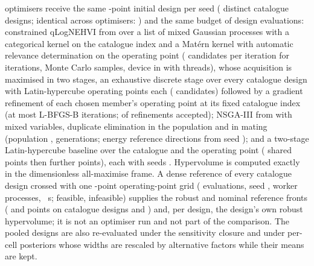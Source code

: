 \MdbStrategyCount{} optimisers receive the same \MdbInitialDesign-point initial design
per seed (\MdbInitialDesign{} distinct catalogue designs; identical across optimisers:
\MdbSharedInitialIdentical) and the same budget of \MdbEvaluationsPerRun{} design
evaluations: constrained qLogNEHVI from \MdbBoLibrary{} \MdbBotorchVersion{} over a
list of mixed Gaussian processes with a categorical kernel on the catalogue index and
a Mat\'ern kernel with automatic relevance determination on the operating point
(\MdbBoBatch{} candidates per iteration for \MdbBoIterations{} iterations,
\MdbBoMcSamples{} Monte Carlo samples, device \texttt{\MdbBoDevice} in
\texttt{\MdbBoDtype} with \MdbBoThreads{} threads), whose acquisition is maximised in
two stages, an exhaustive discrete stage over every catalogue design with
\MdbBoCandidatesPerDesign{} Latin-hypercube operating points each
(\MdbBoCandidateCount{} candidates) followed by a gradient refinement of each chosen
member's operating point at its fixed catalogue index (at most \MdbBoRefineMaxiter{}
L-BFGS-B iterations; \MdbBoRefinementsAccepted{} of \MdbBoRefinements{} refinements
accepted); NSGA-III from \MdbNsgaLibrary{} \MdbPymooVersion{} with mixed variables,
duplicate elimination in the population and in mating (population \MdbNsgaPopulation,
\MdbNsgaGenerations{} generations; \MdbNsgaReferenceDirectionCount{} energy reference
directions from seed \MdbNsgaReferenceDirectionSeed);
and a two-stage Latin-hypercube baseline over the catalogue and the operating point
(\MdbInitialDesign{} shared points then \MdbSecondStage{} further points), each with
seeds \MdbSeeds. Hypervolume is computed exactly in the dimensionless all-maximise
frame. A dense reference of every catalogue design crossed with one
\MdbDensePointsPerDesign-point operating-point grid (\MdbDenseCount{} evaluations, seed
\MdbDenseSeed, \MdbDenseWorkers{} worker processes, \MdbDenseEvaluationSeconds{}~s;
\MdbDenseFeasible{} feasible, \MdbDenseInfeasible{} infeasible) supplies the robust and
nominal reference fronts (\MdbDenseRobustFront{} and \MdbDenseNominalFront{} points on
catalogue designs \MdbDenseRobustFrontDesigns{} and \MdbDenseNominalFrontDesigns) and,
per design, the design's own robust hypervolume; it is not an optimiser run and not
part of the comparison. The pooled designs are also re-evaluated under the sensitivity
closure and under per-cell posteriors whose widths are rescaled by
\MdbWidthAlternativeCount{} alternative factors while their means are kept.

